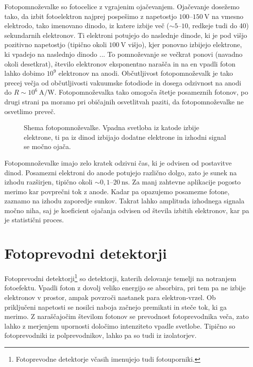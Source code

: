 Fotopomnoževalke so fotocelice z vgrajenim ojačevanjem. Ojačevanje dosežemo tako, da 
izbit fotoelektron najprej pospešimo z napetostjo $100$--$150~\si{\volt}$ na vmesno elektrodo, 
tako imenovano dinodo, iz katere izbije več ($\sim 5$--$10$, redkeje tudi do 40) 
sekundarnih elektronov. Ti elektroni
potujejo do naslednje dinode, ki je pod višjo pozitivno napetostjo (tipično okoli $100~\si{\volt}$
višjo), kjer ponovno izbijejo elektrone, ki vpadejo na naslednjo dinodo ... 
To pomnoževanje se večkrat ponovi (navadno okoli desetkrat),
število elektronov eksponentno narašča in na en vpadli foton lahko dobimo $10^9$ elektronov na anodi. 
Občutljivost fotopomnoževalk je tako precej večja od občutljivosti vakuumske fotodiode in
dosega odzivnost na anodi do $R\sim 10^6~\si{\ampere/\watt}$.
Fotopomnoževalka tako omogoča štetje posameznih fotonov, po drugi strani pa moramo pri 
običajnih osvetlitvah paziti, da fotopomnoževalke ne osvetlimo preveč. 
\begin{figure}[h]
\centering
\def\svgwidth{80truemm} 

\caption{Shema fotopomnoževalke. Vpadna svetloba iz katode izbije elektrone, ti pa 
iz dinod izbijajo dodatne elektrone in izhodni signal se močno ojača.}
\label{fig:PMT}
\end{figure}

Fotopomnoževalke imajo zelo kratek odzivni čas, ki je odvisen od postavitve dinod. Posamezni 
elektroni do anode potujejo različno dolgo, zato je sunek na izhodu 
razširjen, tipično okoli $\sim 0,1$--$20~\si{\nano\second}$.  
Za manj zahtevne aplikacije pogosto merimo kar povprečni tok z anode. Kadar pa opazujemo
posamezne fotone, zaznamo na izhodu zaporedje sunkov. Takrat lahko 
amplituda izhodnega signala močno niha, saj je koeficient ojačanja 
odvisen od števila izbitih elektronov, kar pa je statistični proces. 

\section{Fotoprevodni detektorji}
Fotoprevodni detektorji\footnote{Fotoprevodne detektorje včasih imenujejo tudi fotouporniki.} 
so detektorji, katerih delovanje temelji na notranjem fotoefektu.
Vpadli foton z dovolj veliko energijo se absorbira, pri tem pa ne izbije elektronov v prostor, 
ampak povzroči nastanek para elektron-vrzel. Ob priključeni napetosti se nosilci naboja
začnejo premikati in steče tok, ki ga merimo. Z naraščajočim številom fotonov 
se prevodnost fotoprevodnika veča, zato lahko z merjenjem upornosti določimo 
intenziteto vpadle svetlobe. Tipično so fotoprevodniki iz polprevodnikov, 
lahko pa so tudi iz izolatorjev. 

